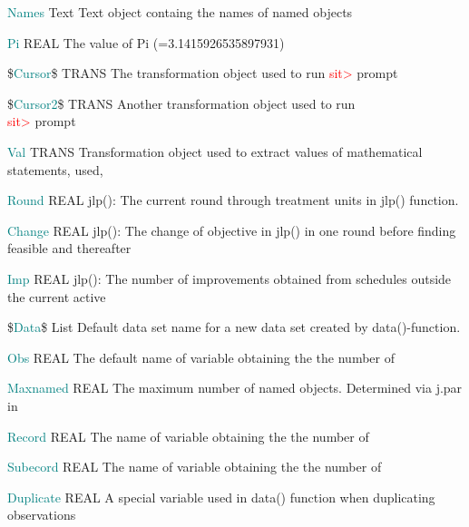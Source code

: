 \noindent \textcolor{teal}{Names} \tabto{25mm }   Text \tabto{45mm }   Text object containg the names of named objects

\noindent \textcolor{teal}{Pi} \tabto{25mm }  REAL \tabto{45mm }  The value of Pi (=3.1415926535897931)

\noindent \$\textcolor{teal}{Cursor}\$ \tabto{25mm }   TRANS  \tabto{45mm }   The transformation object used to run \textcolor{Red}{sit>} prompt

\noindent \$\textcolor{teal}{Cursor2}\$ \tabto{25mm }   TRANS  \tabto{45mm }   Another transformation object used to run \\
\tabto{45mm } \textcolor{Red}{sit>} prompt

\noindent \textcolor{teal}{Val} \tabto{25mm }  TRANS \tabto{45mm }   Transformation object used to extract values of mathematical statements, used,

\noindent \textcolor{teal}{Round}  \tabto{25mm }  REAL \tabto{45mm }   \textcolor{VioletRed}{jlp}(): The current round through treatment units in \textcolor{VioletRed}{jlp}() function.

\noindent \textcolor{teal}{Change} \tabto{25mm }  REAL \tabto{45mm }   \textcolor{VioletRed}{jlp}(): The change of objective in \textcolor{VioletRed}{jlp}()  in one round before finding feasible and thereafter

\noindent \textcolor{teal}{Imp} \tabto{25mm }  REAL \tabto{45mm }   \textcolor{VioletRed}{jlp}(): The number of improvements obtained from schedules outside the current active

\noindent \$\textcolor{teal}{Data}\$  \tabto{25mm }   List \tabto{45mm }   Default data set name for a new data set created by \textcolor{VioletRed}{data}()-function.

\noindent \textcolor{teal}{Obs} \tabto{25mm }   REAL  \tabto{45mm }   The default name of variable obtaining the the number of

\noindent \textcolor{teal}{Maxnamed}  \tabto{25mm }  REAL \tabto{45mm }   The maximum number of named objects. Determined via j.par in

\noindent \textcolor{teal}{Record} \tabto{25mm }   REAL  \tabto{45mm }   The name of variable obtaining the the number of

\noindent \textcolor{teal}{Subecord} \tabto{25mm }   REAL  \tabto{45mm }   The name of variable obtaining the the number of

\noindent \textcolor{teal}{Duplicate} \tabto{25mm }   REAL \tabto{45mm }   A special variable used in \textcolor{VioletRed}{data}() function when duplicating observations

